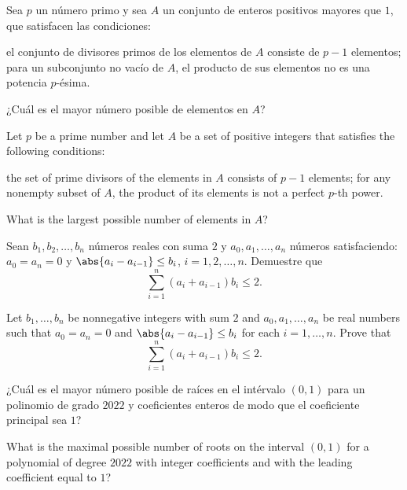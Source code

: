 \begin{problem}[ISL 2003/N8]
  Sea $p$ un número primo y sea $A$ un conjunto de enteros positivos mayores que
  $1$, que satisfacen las condiciones:
  \begin{enumerate}[(i)]
    \ii el conjunto de divisores primos de los elementos de $A$ consiste de
    $p-1$ elementos;
    \ii para un subconjunto no vacío de $A$, el producto de sus elementos no es
    una potencia $p$-ésima.
  \end{enumerate}
  ¿Cuál es el mayor número posible de elementos en $A$?
  \begin{hint}
    Let $p$ be a prime number and let $A$ be a set of positive integers that
    satisfies the following conditions:
    \begin{enumerate}[(i)]
      \ii the set of prime divisors of the elements in $A$ consists of $p-1$
      elements;
      \ii for any nonempty subset of $A$, the product of its elements is not a
      perfect $p$-th power.
    \end{enumerate}
    What is the largest possible number of elements in $A$?
  \end{hint}
\end{problem}

\begin{problem}
  Sean $b_1,b_2,\dots,b_n$ números reales con suma $2$ y $a_0,a_1,\dots,a_n$
  números satisfaciendo: $a_0=a_n=0$ y $\abs{a_i-a_{i-1}}\le b_i$,
  $i=1,2,\dots,n$. Demuestre que
  \[\sum_{i=1}^n(a_i+a_{i-1})b_i\le 2.\]
  \begin{hint}
    Let $b_1,\dots,b_n$ be nonnegative integers with sum $2$ and
    $a_0,a_1,\dots,a_n$ be real numbers such that $a_0=a_n=0$ and
    $\abs{a_i-a_{i-1}}\le b_i$ for each $i=1,\dots,n$. Prove that
    \[\sum_{i=1}^n(a_i+a_{i-1})b_i\le 2.\]
  \end{hint}
\end{problem}

\begin{problem}
  ¿Cuál es el mayor número posible de raíces en el intérvalo $(0,1)$ para un
  polinomio de grado $2022$ y coeficientes enteros de modo que el coeficiente
  principal sea $1$?
  \begin{hint}
    What is the maximal possible number of roots on the interval $(0,1)$ for a
    polynomial of degree $2022$ with integer coefficients and with the leading
    coefficient equal to $1$?
  \end{hint}
\end{problem}

